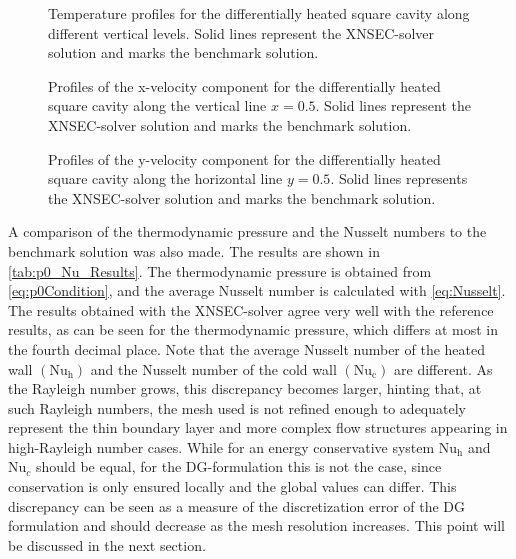 \begin{figure}[h]
	\centering
	\pgfplotsset{width=0.22\textwidth, compat=1.3} 
	\caption[Temperature profiles for the differentially heated square cavity along different vertical levels.]{Temperature profiles for the differentially heated square cavity along different vertical levels. Solid lines represent the XNSEC-solver solution and marks the benchmark solution.}
	\label{fig:TempProfile}
\end{figure}
%
\begin{figure}[h]
	\centering
	\pgfplotsset{width=0.22\textwidth, compat=1.3}
	\caption[Profiles of the x-velocity component for the differentially heated square cavity along the vertical line $x=0.5$.]{Profiles of the x-velocity component for the differentially heated square cavity along the vertical line $x=0.5$. Solid lines represent the XNSEC-solver solution and marks the benchmark solution.}
	\label{fig:VelocityXProfile}
\end{figure}
%
\begin{figure}[h]
	\centering
	\pgfplotsset{width=0.22\textwidth, compat=1.3}
	\caption[Profiles of the y-velocity component for the differentially heated square cavity along the horizontal line $y=0.5$.]{Profiles of the y-velocity component for the differentially heated square cavity along the horizontal line $y=0.5$. Solid lines represents the XNSEC-solver solution and marks the benchmark solution.}
	\label{fig:VelocityYProfile}
\end{figure}
\FloatBarrier
A comparison of the thermodynamic pressure and the Nusselt numbers to the benchmark solution was also made. The results are shown in \cref{tab:p0_Nu_Results}.  The thermodynamic pressure is obtained from \cref{eq:p0Condition}, and the average Nusselt number is calculated with \cref{eq:Nusselt}. The results obtained with the XNSEC-solver agree very well with the reference results, as can be seen for the thermodynamic pressure, which differs at most in the fourth decimal place. Note that the average Nusselt number of the heated wall $(\text{Nu}_\text{h})$ and the Nusselt number of the cold wall $(\text{Nu}_\text{c})$ are different. As the Rayleigh number grows, this discrepancy becomes larger, hinting that, at such Rayleigh numbers, the mesh used is not refined enough to adequately represent the thin boundary layer and more complex flow structures appearing in high-Rayleigh number cases. While for an energy conservative system $\text{Nu}_\text{h}$ and $\text{Nu}_c$ should be equal, for the DG-formulation this is not the case, since conservation is only ensured locally and the global values can differ. This discrepancy can be seen as a measure of the discretization error of the DG formulation and should decrease as the mesh resolution increases. This point will be discussed in the next section.
